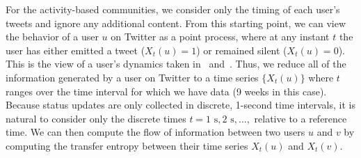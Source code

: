 For the activity-based communities, we consider only the timing of each user's tweets and ignore any additional content. From this starting point, we can view the behavior of a user $u$ on Twitter as a point process, where at any instant $t$ the user has either emitted a tweet ($X_{t}(u) = 1$) or remained silent ($X_{t}(u) = 0$). This is the view of a user's dynamics taken in~\cite{ver2012information} and~\cite{darmon2013understanding}. Thus, we reduce all of the information generated by a user on Twitter to a time series $\{ X_{t}(u)\}$ where $t$ ranges over the time interval for which we have data (9 weeks in this case). Because status updates are only collected in discrete, 1-second time intervals, it is natural to consider only the discrete times $t = 1 \text{ s}, 2 \text{ s}, \ldots, $ relative to a reference time. We can then compute the flow of information between two users $u$ and $v$ by computing the transfer entropy between their time series $X_{t}(u)$ and $X_{t}(v).$

